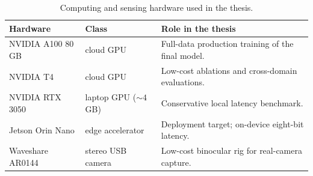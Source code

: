 \begin{table}[H]
\centering
\caption{Computing and sensing hardware used in the thesis.}
\label{tab:hw_tools}
\small
\begin{tabular}{p{3.4cm}p{2.7cm}p{6.3cm}}
\toprule
Hardware & Class & Role in the thesis\\
\midrule
NVIDIA A100 80\,GB & cloud GPU & Full-data production training of the final model.\\
NVIDIA T4 & cloud GPU & Low-cost ablations and cross-domain evaluations.\\
NVIDIA RTX 3050 & laptop GPU (${\sim}4$\,GB) & Conservative local latency benchmark.\\
Jetson Orin Nano & edge accelerator & Deployment target; on-device eight-bit latency.\\
Waveshare AR0144 & stereo USB camera & Low-cost binocular rig for real-camera capture.\\
\bottomrule
\end{tabular}
\end{table}
